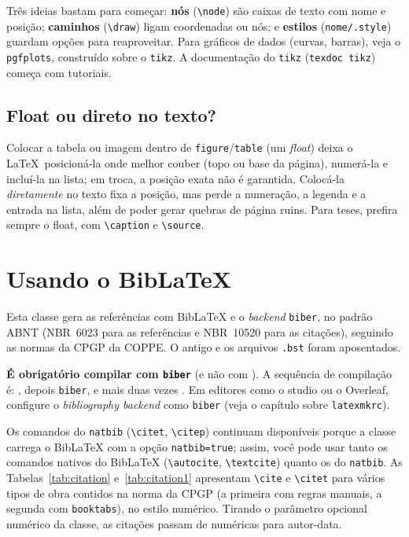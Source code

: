 \documentclass[dsc,setavermelha,numeracaoporcapitulo,linhanafolhaderosto]{ufrj}
\theoremstyle{plain}
\theoremstyle{definition}
\theoremstyle{remark}
\begin{document}
Três ideias bastam para começar: \textbf{nós} (\verb|\node|) são caixas de texto com nome e posição; \textbf{caminhos} (\verb|\draw|) ligam coordenadas ou nós; e \textbf{estilos} (\verb|nome/.style|) guardam opções para reaproveitar. Para gráficos de dados (curvas, barras), veja o \verb|pgfplots|, construído sobre o \verb|tikz|. A documentação do \verb|tikz| (\texttt{texdoc tikz}) começa com tutoriais.

\section{Float ou direto no texto?}

Colocar a tabela ou imagem dentro de \verb|figure|/\verb|table| (um \emph{float}) deixa o \LaTeX\ posicioná-la onde melhor couber (topo ou base da página), numerá-la e incluí-la na lista; em troca, a posição exata não é garantida. Colocá-la \emph{diretamente} no texto fixa a posição, mas perde a numeração, a legenda e a entrada na lista, além de poder gerar quebras de página ruins. Para teses, prefira sempre o float, com \verb|\caption| e \verb|\source|.

  \chapter{Usando o BibLaTeX}
  \label{cap:biblatex}

  Esta classe gera as referências com BibLaTeX e o \emph{backend} \texttt{biber}, no padrão ABNT (NBR~6023 para as referências e NBR~10520 para as citações), seguindo as normas da CPGP da COPPE. O antigo  e os arquivos \texttt{.bst} foram aposentados.

  \textbf{É obrigatório compilar com \texttt{biber}} (e não com ). A sequência de compilação é: , depois \texttt{biber}, e mais duas vezes . Em editores como o studio ou o Overleaf, configure o \emph{bibliography backend} como \texttt{biber} (veja o capítulo sobre \texttt{latexmkrc}).

  Os comandos do \texttt{natbib} (\verb|\citet|, \verb|\citep|) continuam disponíveis porque a classe carrega o BibLaTeX com a opção \texttt{natbib=true}; assim, você pode usar tanto os comandos nativos do BibLaTeX (\verb|\autocite|, \verb|\textcite|) quanto os do \texttt{natbib}. As Tabelas~\ref{tab:citation} e~\ref{tab:citation1} apresentam \verb|\cite| e \verb|\citet| para vários tipos de obra contidos na norma da CPGP (a primeira com regras manuais, a segunda com \texttt{booktabs}), no estilo numérico. Tirando o parâmetro opcional numérico da classe, as citações passam de numéricas para autor-data.
\end{document}
